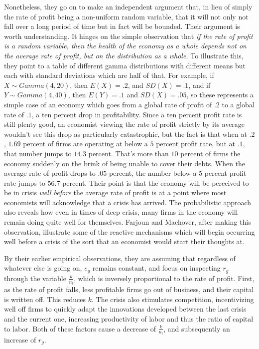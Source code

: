 \documentclass{article}
\theoremstyle{definition}
\theoremstyle{plain}
\theoremstyle{theorem}
\begin{document}
Nonetheless, they go on to make an independent argument that, in lieu of simply the rate of profit being a non-uniform random variable, that it will not only not fall over a long period of time but in fact will be bounded. Their argument is worth understanding. It hinges on the simple observation that \textit{if the rate of profit is a random variable, then the health of the economy as a whole depends not on the average rate of profit, but on the distribution as a whole.} To illustrate this, they point to a table of different gamma distributions with different means but each with standard deviations which are half of that. For example, if $X \sim Gamma(4,20)$, then $E(X) = .2$, and $SD(X) = .1$, and if $Y \sim Gamma(4,40)$, then $E(Y) = .1$ and $SD(X) = .05$, so these represents a simple case of an economy which goes from a global rate of profit of $.2$ to a global rate of $.1$, a ten percent drop in profitability. Since a ten percent profit rate is still plenty good, an economist viewing the rate of profit strictly by its average wouldn't see this drop as particularly catastrophic, but the fact is that when at $.2$, $1.69$ percent of firms are operating at below a $5$ percent profit rate, but at $.1$, that number jumps to $14.3$ percent. That's more than $10$ percent of firms the economy suddenly on the brink of being unable to cover their debts. When the average rate of profit drops to $.05$ percent, the number below a $5$ percent profit rate jumps to $56.7$ percent. Their point is that the economy will be perceived to be in crisis \textit{well before} the average rate of profit is at a point where most economists will acknowledge that a crisis has arrived. The probabilistic approach also reveals how even in times of deep crisis, many firms in the economy will remain doing quite well for themselves. Farjoun and Machover, after making this observation, illustrate some of the reactive mechanisms which will begin occurring well before a crisis of the sort that an economist would start their thoughts at.\par 
By their earlier empirical observations, they are assuming that regardless of whatever else is going on, $e_g$ remains constant, and focus on inspecting $r_g$ through the variable $\frac{k}{n_l}$, which is inversely proportional to the rate of profit. First, as the rate of profit falls, less profitable firms go out of business, and their capital is written off. This reduces $k$. The crisis also stimulates competition, incentivizing well off firms to quickly adapt the innovations developed between the last crisis and the current one, increasing productivity of labor and thus the ratio of capital to labor. Both of these factors cause a decrease of $\frac{k}{n_l}$, and subsequently an increase of $r_g$. \par 
\end{document}
